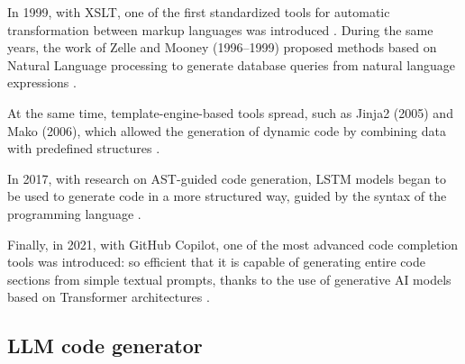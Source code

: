 In 1999, with XSLT, one of the first standardized tools for 
automatic transformation between markup languages was introduced 
\cite{xslt1999}. During the same years, the work of Zelle and 
Mooney (1996–1999) proposed methods based on Natural Language 
processing to generate database queries from natural language 
expressions \cite{zelle1996learning, mooney1997nlidb}.

At the same time, template-engine-based tools spread, such as 
Jinja2 (2005) and Mako (2006), which allowed the generation of 
dynamic code by combining data with predefined structures 
\cite{jinja2docs, makoengine}. 

In 2017, with research on AST-guided code generation, LSTM 
models began to be used to generate code in a more structured 
way, guided by the syntax of the programming language 
\cite{yin2017syntactic}.

Finally, in 2021, with GitHub Copilot, one of the most advanced 
code completion tools was introduced: so efficient that it is 
capable of generating entire code sections from simple textual 
prompts, thanks to the use of generative AI models based on 
Transformer architectures \cite{chen2021codex}.




\subsection{LLM code generator} %